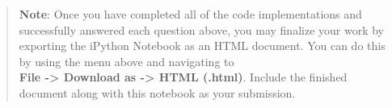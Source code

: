 \documentclass[11pt]{article}
\begin{document}
    \begin{quote}
\textbf{Note}: Once you have completed all of the code implementations
and successfully answered each question above, you may finalize your
work by exporting the iPython Notebook as an HTML document. You can do
this by using the menu above and navigating to\\
\textbf{File -\textgreater{} Download as -\textgreater{} HTML (.html)}.
Include the finished document along with this notebook as your
submission.
\end{quote}


    
    
    
    
\end{document}

